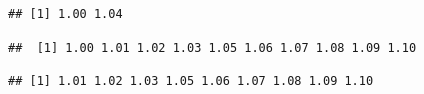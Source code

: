 \begin{knitrout}
\begin{kframe}
\begin{alltt}
\end{alltt}
\begin{verbatim}
## [1] 1.00 1.04
\end{verbatim}
\begin{alltt}
\hlstd{X[}\hlopt{-}\hlstd{]}  
\end{alltt}
\begin{verbatim}
##  [1] 1.00 1.01 1.02 1.03 1.05 1.06 1.07 1.08 1.09 1.10
\end{verbatim}
\begin{alltt}
\hlstd{X[}\hlopt{-}\hlstd{(}\hlstd{,}\hlstd{)]} 
\end{alltt}
\begin{verbatim}
## [1] 1.01 1.02 1.03 1.05 1.06 1.07 1.08 1.09 1.10
\end{verbatim}
\end{kframe}
\end{knitrout}

